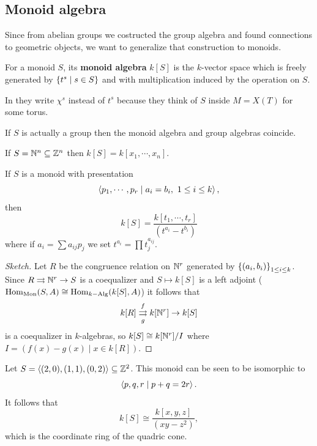 \subsection{Monoid algebra}
Since from abelian groups we costructed the group algebra and found connections to geometric objects, we want to generalize that construction to monoids.

\begin{definition}
For a monoid $S$, its \textbf{monoid algebra} $k[S]$ is the $k$-vector space which is freely generated by $\left\{{t^s\mid s\in S}\right\}$ and with multiplication induced by the operation on $S$.
\end{definition}


\begin{remark}
In \cite{cox2011toric} they write $\chi^s$ instead of $t^s$ because they think of $S$ inside $M=X(T)$ for some torus.
\end{remark}

\begin{remark}
If $S$ is actually a group then the monoid algebra and group algebras coincide.
\end{remark}


\begin{example}
If $S=\mathbb{N}^n\subseteq \mathbb{Z}^n$ then $k[S]=k[x_1,\cdots, x_n]$.
\end{example}


\begin{proposition}
If $S$ is a monoid with presentation 
\[\left\langle {p_1,\cdots, p_r\mid a_i=b_i,\ 1\leq i\leq k}\right\rangle,\] 
then
\[k[S]=\frac{k[t_1,\cdots, t_r]}{(t^{a_i}-t^{b_i})}\]
where if $a_i=\sum a_{ij}p_j$ we set $t^{a_i}=\prod t_j^{a_{ij}}$.
\end{proposition}
\begin{proof}[Sketch]
Let $R$ be the congruence relation on $\mathbb{N}^r$ generated by $\left\{{(a_i,b_i)}\right\}_{1\leq i\leq k}$. Since $R\rightrightarrows \mathbb{N}^r\to S$ is a coequalizer and $S\mapsto k[S]$ is a left adjoint ($\operatorname{Hom}_{\text{Mon}}(S,A)\cong \operatorname{Hom}_{k-\text{Alg}}(k[S],A)$) it follows that
\[k[R]\overset f{\underset g\rightrightarrows} k[\mathbb{N}^r]\to k[S]\] 
is a coequalizer in $k$-algebras, so $k[S]\cong k[\mathbb{N}^r]/I$ where $I=(f(x)-g(x)\mid x\in k[R])$.
\end{proof}



\begin{example}
Let $S=\left\langle {(2,0),(1,1),(0,2)}\right\rangle\subseteq \mathbb{Z}^2$. This monoid can be seen to be isomorphic to
\[\left\langle {p,q,r\mid p+q=2r}\right\rangle.\]
It follows that
\[k[S]\cong\frac{k[x,y,z]}{(xy-z^2)},\]
which is the coordinate ring of the quadric cone.
\end{example}

